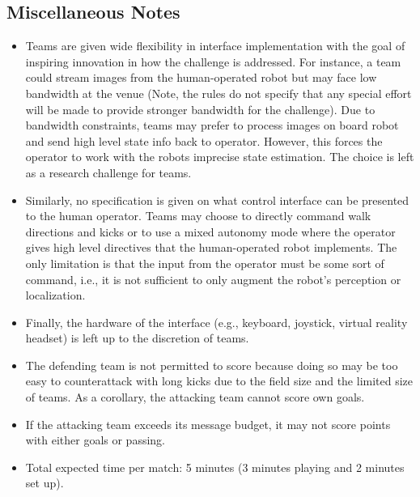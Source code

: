\subsection{Miscellaneous Notes}

\begin{itemize}
\item Teams are given wide flexibility in interface implementation with the goal of inspiring innovation in how the challenge is addressed. For instance, a team could stream images from the human-operated robot but may face low bandwidth at the venue  (Note, the rules do not specify that any special effort will be made to provide stronger bandwidth for the challenge). Due to bandwidth constraints, teams may prefer to process images on board robot and send high level state info back to operator. However, this forces the operator to work with the robots imprecise state estimation. The choice is left as a research challenge for teams. 
\item Similarly, no specification is given on what control interface can be presented to the human operator. Teams may choose to directly command walk directions and kicks or to use a mixed autonomy mode where the operator gives high level directives that the human-operated robot implements. The only limitation is that the input from the operator must be some sort of command, i.e., it is not sufficient to only augment the robot's perception or localization.
\item Finally, the hardware of the interface (e.g., keyboard, joystick, virtual reality headset) is left up to the discretion of teams.
\item The defending team is not permitted to score because doing so may be too easy to counterattack with long kicks due to the field size and the limited size of teams. As a corollary, the attacking team cannot score own goals.
\item If the attacking team exceeds its message budget, it may not score points with either goals or passing.
\item Total expected time per match: 5 minutes (3 minutes playing and 2 minutes set up). 
\end{itemize}

